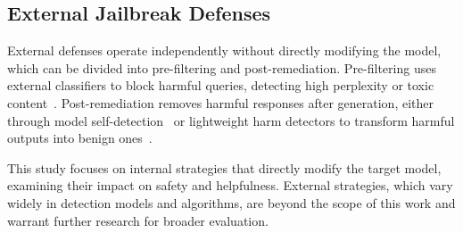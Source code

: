\subsection{External Jailbreak Defenses}
External defenses operate independently without directly modifying the model, which can be divided into pre-filtering and post-remediation. Pre-filtering uses external classifiers to block harmful queries, detecting high perplexity or toxic content~\cite{alon2023detecting,kim2023lifetox,kumar2024certifying}. Post-remediation removes harmful responses after generation, either through model self-detection~\cite{phute2023llm} or lightweight harm detectors to transform harmful outputs into benign ones~\cite{pi2024mllm}.

This study focuses on internal strategies that directly modify the target model, examining their impact on safety and helpfulness. External strategies, which vary widely in detection models and algorithms, are beyond the scope of this work and warrant further research for broader evaluation.

